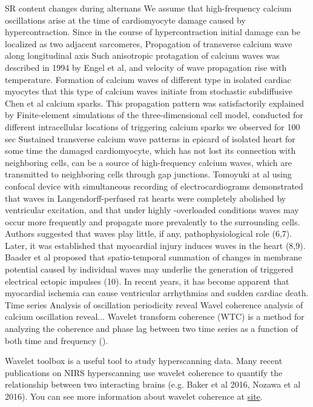 \documentclass{biophys-new}
\begin{document}
SR  content changes during alternans \cite{diaz2004sarcoplasmic}
We assume that high-frequency calcium oscillations arise at the time of cardiomyocyte damage caused by hypercontraction.
Since in the course of hypercontraction initial damage can be localized as two adjacent sarcomeres,
Propagation of transverse calcium wave along longitudinal axis
Such anisotropic protagation of calcium waves was described in 1994 by Engel et al, and velocity of wave propagation rise with temperature.
Formation of calcium waves of different type in isolated cardiac myocytes \cite{ishida1999formation}
that this type of calcium waves initiate from stochastic \cite{izu2001evolution} subdiffusive  \cite{chen2014ryanodine} Chen et al  calcium sparks.
This propagation pattern was satisfactorily explained by Finite-element simulations of the three-dimensional cell model, conducted for different intracellular locations of triggering calcium sparks \cite{tracqui2009integrated}
we observed for 100 sec Sustained transverse calcium wave patterns in epicard of isolated heart
for some time the damaged cardiomyocyte, which has not lost its connection with neighboring cells, can be a source of high-frequency calcium waves, which are transmitted to neighboring cells through gap junctions.
Tomoyuki at al using confocal device with simultaneous recording of electrocardiograms demonstrated that  waves in Langendorff-perfused rat hearts were completely abolished by ventricular excitation, and that under highly  -overloaded conditions  waves may occur more frequently and propagate more prevalently to the surrounding cells. Authors suggested that  waves play little, if any, pathophysiological role (6,7). Later, it was established that myocardial injury induces  waves in the heart (8,9). Baader et al proposed that spatio-temporal summation of changes in membrane potential caused by individual  waves may underlie the generation of triggered electrical ectopic impulses (10).
In recent years, it has become apparent that myocardial ischemia can cause ventricular arrhythmias and sudden cardiac death.
Time series
Analysis of oscillation periodicity reveal
Wavel coherence analysis of calcium oscillation reveal...
Wavelet transform coherence (WTC) is a method for analyzing the coherence and phase lag between two time series as a function of both time and frequency (\cite{chang2010time}).


Wavelet toolbox is a useful tool to study hyperscanning data. Many recent publications on NIRS hyperscanning use wavelet coherence to quantify the relationship between two interacting brains (e.g. Baker et al 2016, Nozawa et al 2016). You can see more information about wavelet coherence at \href{http://www.alivelearn.net/?p=1169}{site}.
\end{document}
